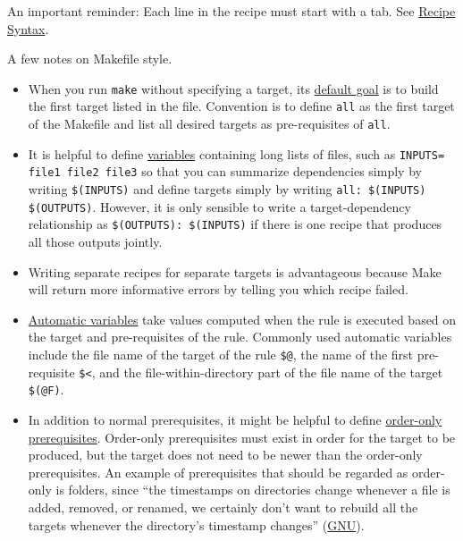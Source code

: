 An important reminder: Each line in the recipe must start with a tab.
See \href{https://www.gnu.org/software/make/manual/html_node/Recipe-Syntax.html}{Recipe Syntax}.

A few notes on Makefile style.
\begin{itemize}
\item
When you run \texttt{make} without specifying a target,
its \href{https://www.gnu.org/software/make/manual/html_node/How-Make-Works.html#How-Make-Works}{default goal}
is to build the first target listed in the file.
Convention is to define \texttt{all} as the first target of the Makefile and list all desired targets as pre-requisites of \texttt{all}.
\item It is helpful to define \href{https://www.gnu.org/software/make/manual/html_node/Variables-Simplify.html#Variables-Simplify}{variables} containing long lists of files, such as \texttt{INPUTS= file1 file2 file3}
so that you can summarize dependencies simply by writing \texttt{\$(INPUTS)}
and define targets simply by writing \texttt{all: \$(INPUTS) \$(OUTPUTS)}.
However, it is only sensible to write a target-dependency relationship as
\texttt{\$(OUTPUTS): \$(INPUTS)}
if there is one recipe that produces all those outputs jointly.
\item Writing separate recipes for separate targets is advantageous because Make will return more informative errors by telling you which recipe failed.
\item \href{https://www.gnu.org/software/make/manual/html_node/Automatic-Variables.html}{Automatic variables} take values computed when the rule is executed based on the target and pre-requisites of the rule.
Commonly used automatic variables include
the file name of the target of the rule \texttt{\$@},
the name of the first pre-requisite \texttt{\$<},
and
the file-within-directory part of the file name of the target \texttt{\$(@F)}.
\item In addition to normal prerequisites, it might be helpful to define \href{https://www.gnu.org/software/make/manual/html_node/Prerequisite-Types.html}{order-only prerequisites}.
Order-only prerequisites must exist in order for the target to be produced, but the target does not need to be newer than the order-only prerequisites.
An example of prerequisites that should be regarded as order-only is folders, since ``the timestamps on directories change whenever a file is added, removed, or renamed, we certainly don’t want to rebuild all the targets whenever the directory’s timestamp changes'' (\href{https://www.gnu.org/software/make/manual/html_node/Prerequisite-Types.html}{GNU}).

\end{itemize}
